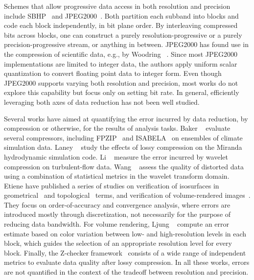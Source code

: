 Schemes that allow progressive data access in both resolution and precision include
SBHP~\cite{sbhp2000} and JPEG2000~\cite{jpeg2000}. Both partition each subband into blocks and code
each block independently, in bit plane order. By interleaving compressed bits across blocks, one can
construct a purely resolution-progressive or a purely precision-progressive stream, or anything in
between. JPEG2000 has found use in the compression of scientific data, e.g., by Woodring \etal
~\cite{woodring2011}. Since most JPEG2000 implementations are limited to integer data, the authors
apply uniform scalar quantization to convert floating point data to integer form. Even though
JPEG2000 supports varying both resolution and precision, most works do not explore this capability
but focus only on setting bit rate. In general, efficiently leveraging both axes of data reduction
has not been well studied.

Several works have aimed at quantifying the error incurred by data reduction, by compression or
otherwise, for the results of analysis tasks. Baker \etal~\cite{evaluating-compression-climate}
evaluate several compressors, including FPZIP~\cite{fpzip} and ISABELA~\cite{isabela} on ensembles
of climate simulation data. Laney \etal~\cite{compression_sim2013} study the effects of lossy
compression on the Miranda hydrodynamic simulation code. Li \etal~\cite{evaluating-efficacy-wavelet}
measure the error incurred by wavelet compression on turbulent-flow data. Wang
\etal~\cite{statistical-volume-quality} assess the quality of distorted data using a combination of
statistical metrics in the wavelet transform domain. Etiene \etal have published a series of studies
on verification of isosurfaces in geometrical~\cite{verifiable-isosurface} and
topological~\cite{topology-verification-isosurface} terms, and verification of volume-rendered
images~\cite{verifying-volume-rendering}. They focus on order-of-accuracy and convergence analysis,
where errors are introduced mostly through discretization, not necessarily for the purpose of
reducing data bandwidth. For volume rendering, Ljung \etal~\cite{transfer-function-based} compute an
error estimate based on color variation between low- and high-resolution levels in each block, which
guides the selection of an appropriate resolution level for every block. Finally, the Z-checker
framework~\cite{z-checker} consists of a wide range of independent metrics to evaluate data quality
after lossy compression. In all these works, errors are not quantified in the context of the
tradeoff between resolution and precision.

